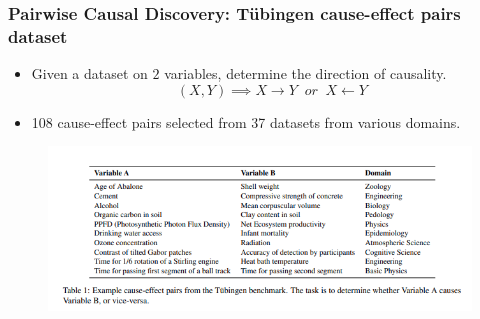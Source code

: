 \documentclass{beamer}
\begin{document}
\begin{frame}
	\frametitle{Pairwise Causal Discovery: T\"{u}bingen cause-effect pairs dataset}
	\begin{itemize}
		\item Given a dataset on $ 2 $ variables, determine the direction of causality.
			$$ (X, Y) \implies X \rightarrow Y \;\; \textit{or} \; \; X \leftarrow Y $$
		\item 108 cause-effect pairs selected from 37 datasets from
			various domains.
	\end{itemize}
	\begin{figure}
		\centering
		\includegraphics[scale=0.5]{imgs/table1.png}
	\end{figure}
\end{frame}
\end{document}

